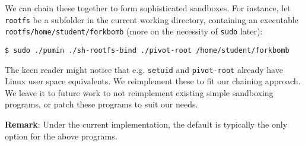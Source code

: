 We can chain these together to form sophisticated sandboxes. For instance, let
\texttt{rootfs} be a subfolder in the current working directory, containing an
executable \texttt{rootfs/home/student/forkbomb} (more on the necessity of
\texttt{sudo} later):

\begin{lstlisting}
$ sudo ./pumin ./sh-rootfs-bind ./pivot-root /home/student/forkbomb
\end{lstlisting}

The keen reader might notice that e.g. \texttt{setuid} and \texttt{pivot-root}
already have Linux user space equivalents. We reimplement these to fit our
chaining approach. We leave it to future work to not reimplement existing
simple sandboxing programs, or patch these programs to suit our needs.

\textbf{Remark}: Under the current implementation, the default is typically the
only option for the above programs.
